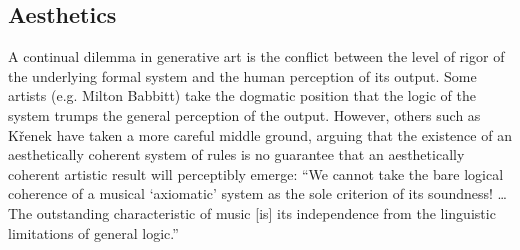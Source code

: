 \subsection{Aesthetics}
A continual dilemma in generative art is the conflict between the level of rigor of the underlying formal system and the human perception of its output. Some artists (e.g. Milton Babbitt) take the dogmatic position that the logic of the system trumps the general perception of the output. \cite{babbitt1958cares}  However, others such as K{\v{r}}enek have taken a more careful middle ground, arguing that the existence of an aesthetically coherent system of rules is no guarantee that an aesthetically coherent artistic result will perceptibly emerge: ``We cannot take the bare logical coherence of a musical `axiomatic' system as the sole criterion of its soundness! \dots The outstanding characteristic of music [is] its independence from the linguistic limitations of general logic.'' \cite{kvrenek1939music}